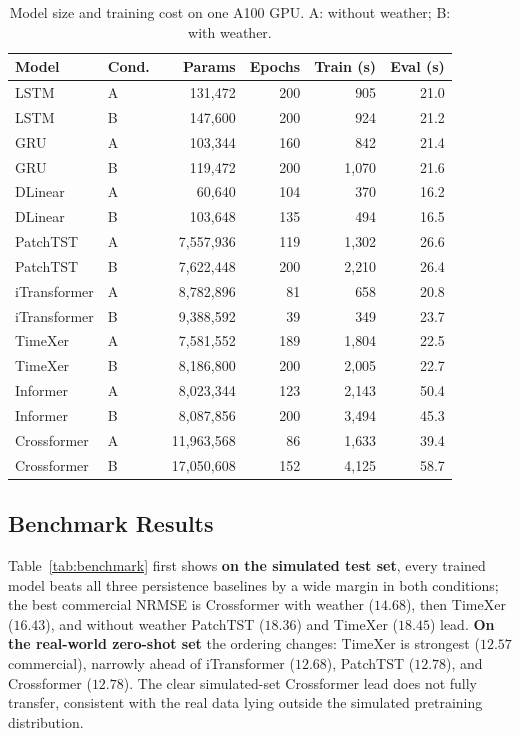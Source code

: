\documentclass[11pt]{article}
\begin{document}
\begin{table}[H]
\centering
\begin{tabular}{llrrrr}
\toprule
Model & Cond.\ & Params & Epochs & Train (s) & Eval (s) \\
\midrule
LSTM         & A & 131{,}472    & 200 & 905    & 21.0 \\
LSTM         & B & 147{,}600    & 200 & 924    & 21.2 \\
GRU          & A & 103{,}344    & 160 & 842    & 21.4 \\
GRU          & B & 119{,}472    & 200 & 1{,}070 & 21.6 \\
DLinear      & A & 60{,}640     & 104 & 370    & 16.2 \\
DLinear      & B & 103{,}648    & 135 & 494    & 16.5 \\
PatchTST     & A & 7{,}557{,}936 & 119 & 1{,}302 & 26.6 \\
PatchTST     & B & 7{,}622{,}448 & 200 & 2{,}210 & 26.4 \\
iTransformer & A & 8{,}782{,}896 & 81  & 658    & 20.8 \\
iTransformer & B & 9{,}388{,}592 & 39  & 349    & 23.7 \\
TimeXer      & A & 7{,}581{,}552 & 189 & 1{,}804 & 22.5 \\
TimeXer      & B & 8{,}186{,}800 & 200 & 2{,}005 & 22.7 \\
Informer     & A & 8{,}023{,}344 & 123 & 2{,}143 & 50.4 \\
Informer     & B & 8{,}087{,}856 & 200 & 3{,}494 & 45.3 \\
Crossformer  & A & 11{,}963{,}568 & 86  & 1{,}633 & 39.4 \\
Crossformer  & B & 17{,}050{,}608 & 152 & 4{,}125 & 58.7 \\
\bottomrule
\end{tabular}
\caption{Model size and training cost on one A100 GPU. A: without weather;
B: with weather.}
\label{tab:compute}
\end{table}

\subsection{Benchmark Results}
\label{sec:benchmark}
Table~\ref{tab:benchmark} first shows 
\textbf{on the simulated test set}, every trained model beats all three
persistence baselines by a wide margin in both conditions; the
best commercial NRMSE is Crossformer with weather ($14.68$), then TimeXer
($16.43$), and without weather PatchTST ($18.36$) and TimeXer ($18.45$) lead.
\textbf{On the real-world zero-shot set} the ordering changes: TimeXer is strongest
($12.57$ commercial), narrowly ahead of iTransformer ($12.68$), PatchTST ($12.78$),
and Crossformer ($12.78$). The clear simulated-set Crossformer lead does not fully
transfer, consistent with the real data lying outside the simulated pretraining
distribution.
\end{document}
